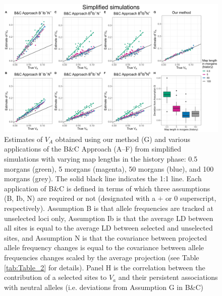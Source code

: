 \documentclass[12pt]{article}
\begin{document}
\begin{bibunit}
\begin{landscape}
\begin{figure}[H]
\begin{center}
\includegraphics[scale = 0.14]{Figures/Fig5.jpg}
\end{center}
\caption{Estimates of $V_A$ obtained using our method (G) and various applications of the B\&C Approach (A--F) from simplified simulations with varying 
    map lengths in the history phase: 0.5 morgans (green), 5 morgans (magenta), 50 morgans (blue), and 100 morgans (grey). The solid black line indicates the 1:1 line. Each application of B\&C is defined in terms of which three assumptions (B, Ib, N) are required or not (designated with a $+$ or 0 superscript, respectively). Assumption B is that allele frequencies are tracked at unselected loci only, Assumption Ib is that the average LD between all sites is equal to the average LD between selected and unselected sites, and Assumption N is that the covariance between projected allele frequency changes is equal to the covariance between allele frequencies changes scaled by the average projection (see Table \ref{tab:Table_2} for details). Panel H is the correlation between the contribution of a selected sites to $V_a$ and their persistent associations with neutral alleles (i.e. deviations from Assumption G in B\&C)}
    \label{fig:Figure 5}
\end{figure}
\end{landscape}


\end{bibunit}
\end{document}
